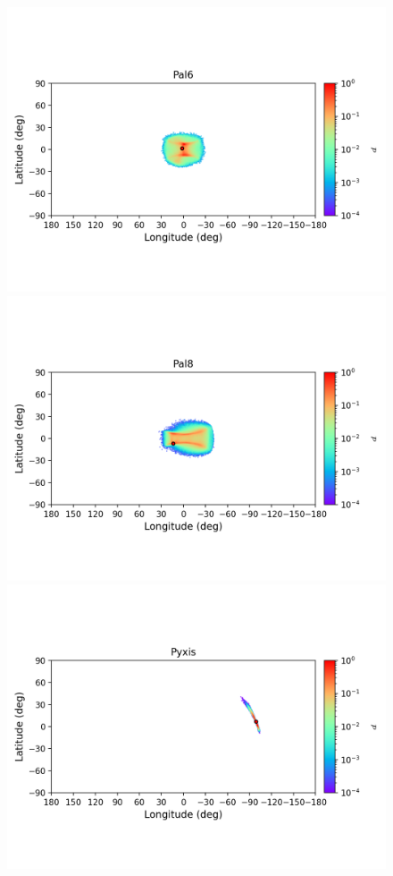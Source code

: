 \begin{figure}
        \includegraphics[clip=true, trim = 0mm 20mm 0mm 10mm, width=1\columnwidth]{images/error_plots_Pal6.png}
        \includegraphics[clip=true, trim = 0mm 20mm 0mm 10mm, width=1\columnwidth]{images/error_plots_Pal8.png}
        \includegraphics[clip=true, trim = 0mm 20mm 0mm 10mm, width=1\columnwidth]{images/error_plots_Pyxis.png}

\end{figure}
